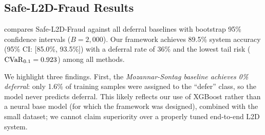 \subsection{Safe-L2D-Fraud Results}
\label{sec:exp_results}

 compares Safe-L2D-Fraud against all deferral baselines with bootstrap 95\% confidence intervals ($B = 2{,}000$). Our framework achieves 89.5\% system accuracy (95\% CI: [85.0\%, 93.5\%]) with a deferral rate of 36\% and the lowest tail risk ($\mathrm{CVaR}_{0.1} = 0.923$) among all methods.

\begin{table}[H]
\caption{System-level performance with 95\% bootstrap CIs ($B{=}2{,}000$). Safe-L2D-Fraud achieves the best accuracy with controlled tail risk.}
\label{tab:l2d_results}
\vskip 0.1in
\begin{center}
\end{center}
\vskip -0.1in
\end{table}

We highlight three findings. First, the \textit{Mozannar-Sontag baseline achieves 0\% deferral}: only 1.6\% of training samples were assigned to the ``defer'' class, so the model never predicts deferral. This likely reflects our use of XGBoost rather than a neural base model (for which the framework was designed), combined with the small dataset; we cannot claim superiority over a properly tuned end-to-end L2D system.

